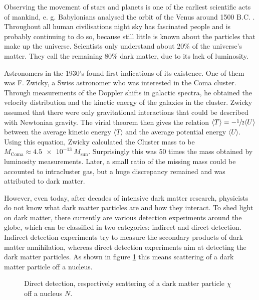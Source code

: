 Observing the movement of stars and planets is one of the earliest scientific acts of mankind, e. g. Babylonians analysed the orbit of the Venus around 1500 B.C. \cite{History}. Throughout all human civilisations night sky has fascinated people and is probably continuing to do so, because still little is known about the particles that make up the universe. Scientists only understand about 20\% of the universe's matter. They call the remaining 80\% dark matter, due to its lack of luminosity. \cite{DM}


Astronomers in the 1930's found first indications of its existence. One of them was F. Zwicky, a Swiss astronomer who was interested in the Coma cluster. Through measurements of the Doppler shifts in galactic spectra, he obtained the velocity distribution and the kinetic energy of the galaxies in the cluster. Zwicky assumed that there were only gravitational interactions that could be described with Newtonian gravity. The virial theorem then gives the relation $\langle T\rangle = -\sfrac{1}{2}\langle U\rangle$ between the average kinetic energy $\langle T\rangle$ and the average potential energy $\langle U\rangle$. Using this equation, Zwicky calculated the Cluster mass to be $M_\text{Coma} \approx \SI{4.5e-13}{}M_\text{sun}$. Surprisingly this was 50 times the mass obtained by luminosity measurements. Later, a small ratio of the missing mass could be accounted to intracluster gas, but a huge discrepancy remained and was attributed to dark matter. \cite{DM}


\begin{minipage}{0.55\textwidth}
	However, even today, after decades of intensive dark matter research, physicists do not know what dark matter particles are and how they interact. To shed light on dark matter, there currently are various detection experiments around the globe, which can be classified in two categories: indirect and direct detection. Indirect detection experiments try to measure the secondary products of dark matter annihilation, whereas direct detection experiments aim at detecting the dark matter particles. As shown in figure \ref{fig:DirectDetection} this means scattering of a dark matter particle off a nucleus.
\end{minipage} \hfill
\begin{minipage}{0.4\textwidth}
	\begin{figure}[H]
		
		\captionsetup{width=\textwidth}
		\caption{Direct detection, respectively scattering of a dark matter particle $\chi$ off a nucleus $N$.}
		\label{fig:DirectDetection}
	\end{figure}
\end{minipage}


